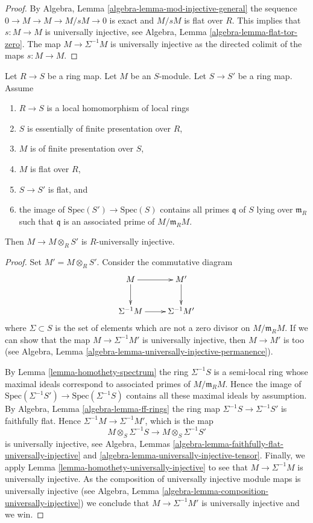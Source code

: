 \begin{proof}
By
Algebra, Lemma \ref{algebra-lemma-mod-injective-general}
the sequence $0 \to M \to M \to M/sM \to 0$ is exact and
$M/sM$ is flat over $R$. This implies that $s : M \to M$
is universally injective, see
Algebra, Lemma \ref{algebra-lemma-flat-tor-zero}.
The map $M \to \Sigma^{-1}M$ is universally injective as the directed
colimit of the maps $s : M \to M$.
\end{proof}

\begin{lemma}
\label{lemma-base-change-universally-flat-local}
Let $R \to S$ be a ring map.
Let $M$ be an $S$-module.
Let $S \to S'$ be a ring map.
Assume
\begin{enumerate}
\item $R \to S$ is a local homomorphism of local rings
\item $S$ is essentially of finite presentation over $R$,
\item $M$ is of finite presentation over $S$,
\item $M$ is flat over $R$,
\item $S \to S'$ is flat, and
\item the image of $\text{Spec}(S') \to \text{Spec}(S)$ contains
all primes $\mathfrak q$ of $S$ lying over $\mathfrak m_R$
such that $\mathfrak q$ is an associated prime of $M/\mathfrak m_R M$.
\end{enumerate}
Then $M \to M \otimes_R S'$ is $R$-universally injective.
\end{lemma}

\begin{proof}
Set $M' = M \otimes_R S'$. Consider the commutative diagram
$$
\xymatrix{
M \ar[d] \ar[r] & M' \ar[d] \\
\Sigma^{-1}M \ar[r] & \Sigma^{-1}M'
}
$$
where $\Sigma \subset S$ is the set of elements which are not a
zero divisor on $M/\mathfrak m_R M$. If we can show that the map
$M \to \Sigma^{-1}M'$ is universally injective, then $M \to M'$
is too (see
Algebra, Lemma \ref{algebra-lemma-universally-injective-permanence}).

\medskip\noindent
By
Lemma \ref{lemma-homothety-spectrum}
the ring $\Sigma^{-1}S$ is a semi-local ring whose maximal ideals
correspond to associated primes of $M/\mathfrak m_R M$.
Hence the image of
$\text{Spec}(\Sigma^{-1}S') \to \text{Spec}(\Sigma^{-1}S)$
contains all these maximal ideals by assumption. By
Algebra, Lemma \ref{algebra-lemma-ff-rings}
the ring map $\Sigma^{-1}S \to \Sigma^{-1}S'$ is faithfully flat.
Hence $\Sigma^{-1}M \to \Sigma^{-1}M'$, which is the map
$$
M \otimes_S \Sigma^{-1}S \longrightarrow M \otimes_S \Sigma^{-1}S'
$$
is universally injective, see
Algebra, Lemmas \ref{algebra-lemma-faithfully-flat-universally-injective} and
\ref{algebra-lemma-universally-injective-tensor}.
Finally, we apply
Lemma \ref{lemma-homothety-universally-injective}
to see that $M \to \Sigma^{-1}M$ is universally injective.
As the composition of universally injective module maps is universally
injective (see
Algebra, Lemma \ref{algebra-lemma-composition-universally-injective})
we conclude that $M \to \Sigma^{-1}M'$ is universally injective and we win.
\end{proof}


